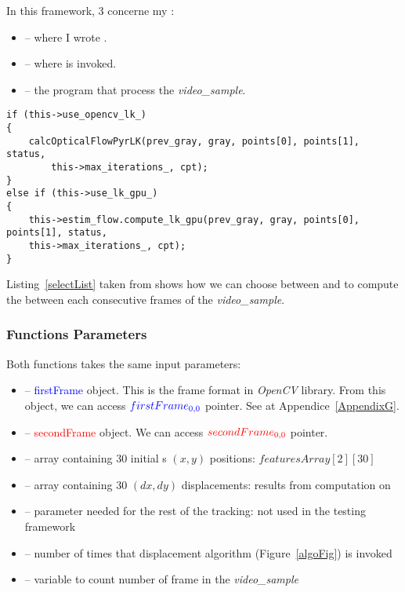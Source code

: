 In this framework, 3  concerne my \api{}:
\begin{itemize}
	\item {} -- where I wrote .
	\item {} -- where  is invoked.
	\item {} -- the  program that process the \emph{video\_sample}.
\end{itemize}


\begin{lstlisting}
if (this->use_opencv_lk_)
{
	calcOpticalFlowPyrLK(prev_gray, gray, points[0], points[1], status,
        this->max_iterations_, cpt);
}
else if (this->use_lk_gpu_)
{
	this->estim_flow.compute_lk_gpu(prev_gray, gray, points[0], points[1], status,
	this->max_iterations_, cpt);
}
\end{lstlisting}


Listing~\ref{selectList} taken from  shows how we can choose between  and  to compute the \flow{} between each consecutive frames of the \emph{video\_sample}.

\subsubsection{Functions Parameters}\label{fctParams}

Both functions takes the same input parameters:
\begin{itemize}
	\item {} -- \textcolor{blue}{firstFrame}  object. This is the frame format in \emph{OpenCV} library. From this object, we can access $\textcolor{blue}{firstFrame_{0,0}}$ pointer. See  at Appendice~\ref{AppendixG}.
	\item {} -- \textcolor{red}{secondFrame}  object. We can access $\textcolor{red}{secondFrame_{0,0}}$ pointer.
	\item {} -- array containing 30 initial \feat{}s $(x,y)$ positions:  $featuresArray[2][30]$
	\item {} -- array containing 30 $(dx, dy)$ displacements: results from \flow{} computation on \vc
	\item {} -- parameter needed for the rest of the tracking: not used in the testing framework
	\item {} -- number of times that displacement algorithm (Figure~\ref{algoFig}) is invoked
	\item {} -- variable to count number of frame in the \emph{video\_sample}
\end{itemize}

